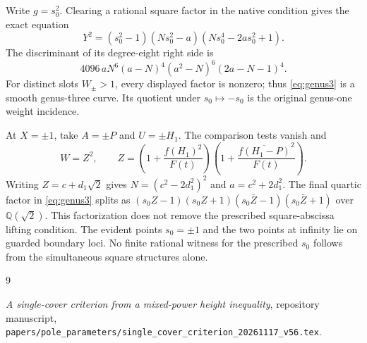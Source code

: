 \documentclass[11pt,a4paper]{article}
\newcommand{\Q}{\mathbb Q}\newcommand{\Z}{\mathbb Z}
\begin{document}
Write $g=s_0^2$. Clearing a rational square factor in the native
condition gives the exact equation
\begin{equation}\label{eq:genus3}
 Y^2=(s_0^2-1)(Ns_0^2-a)(Ns_0^4-2as_0^2+1).
\end{equation}
The discriminant of its degree-eight right side is
\[
 4096\,aN^6(a-N)^4(a^2-N)^6(2a-N-1)^4.
\]
For distinct slots $W_\pm>1$, every displayed factor is nonzero;
thus \eqref{eq:genus3} is a smooth genus-three curve. Its quotient
under $s_0\mapsto-s_0$ is the original genus-one weight incidence.

At $X=\pm1$, take $A=\pm P$ and $U=\pm H_1$. The comparison
tests vanish and
\[
 W=Z^2,\qquad
 Z=\left(1+\frac{f(H_1)^2}{F(t)}\right)
   \left(1+\frac{\overline{f(H_1-P)}^2}{F(t)}\right).
\]
Writing $Z=c+d_1\sqrt2$ gives $N=(c^2-2d_1^2)^2$ and
$a=c^2+2d_1^2$. The final quartic factor in
\eqref{eq:genus3} splits as
$(s_0Z-1)(s_0Z+1)(s_0\bar Z-1)(s_0\bar Z+1)$ over
$\Q(\sqrt2)$. This factorization does not remove the prescribed
square-abscissa lifting condition. The evident points $s_0=\pm1$
and the two points at infinity lie on guarded boundary loci.
No finite rational witness for the prescribed $s_0$ follows from
the simultaneous square structures alone.

\begin{thebibliography}{9}\raggedright
{}\emph{A single-cover criterion from a mixed-power height
inequality}, repository manuscript,
\nolinkurl{papers/pole_parameters/single_cover_criterion_20261117_v56.tex}.
\end{thebibliography}
\end{document}
